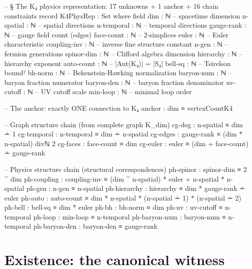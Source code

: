 \documentclass[11pt,a4paper]{book}
\begin{document}
\begin{code}
-- § The K₄ physics representation: 17 unknowns + 1 anchor + 16 chain constraints
record K4PhysRep : Set where
  field
    dim          : ℕ     -- spacetime dimension
    n-spatial    : ℕ     -- spatial directions
    n-temporal   : ℕ     -- temporal directions
    gauge-rank   : ℕ     -- gauge field count (edges)
    face-count   : ℕ     -- 2-simplices
    euler        : ℕ     -- Euler characteristic
    coupling-inv : ℕ     -- inverse fine structure constant
    n-gen        : ℕ     -- fermion generations
    spinor-dim   : ℕ     -- Clifford algebra dimension
    hierarchy    : ℕ     -- hierarchy exponent
    auto-count   : ℕ     -- |Aut(K₄)| = |S₄|
    bell-sq      : ℕ     -- Tsirelson bound²
    bh-norm      : ℕ     -- Bekenstein-Hawking normalization
    baryon-num   : ℕ     -- baryon fraction numerator
    baryon-den   : ℕ     -- baryon fraction denominator
    uv-cutoff    : ℕ     -- UV cutoff scale
    min-loop     : ℕ     -- minimal loop order

    -- The anchor: exactly ONE connection to K₄
    anchor : dim ≡ vertexCountK4

    -- Graph structure chain (from complete graph K_dim)
    cg-deg      : n-spatial ≡ dim ∸ 1
    cg-temporal : n-temporal ≡ dim ∸ n-spatial
    cg-edges    : gauge-rank ≡ (dim * n-spatial) divℕ 2
    cg-faces    : face-count ≡ dim
    cg-euler    : euler ≡ (dim + face-count) ∸ gauge-rank

    -- Physics structure chain (structural correspondences)
    ph-spinor   : spinor-dim ≡ 2 ^ dim
    ph-coupling : coupling-inv ≡ (dim ^ n-spatial) * euler + n-spatial * n-spatial
    ph-gen      : n-gen ≡ n-spatial
    ph-hierarchy : hierarchy ≡ dim * gauge-rank ∸ euler
    ph-auto     : auto-count ≡ dim * n-spatial * (n-spatial ∸ 1) * (n-spatial ∸ 2)
    ph-bell     : bell-sq ≡ dim * euler
    ph-bh       : bh-norm ≡ dim
    ph-uv       : uv-cutoff ≡ n-temporal
    ph-loop     : min-loop ≡ n-temporal
    ph-baryon-num : baryon-num ≡ n-temporal
    ph-baryon-den : baryon-den ≡ gauge-rank
\end{code}


\section{Existence: the canonical witness}
\end{document}
